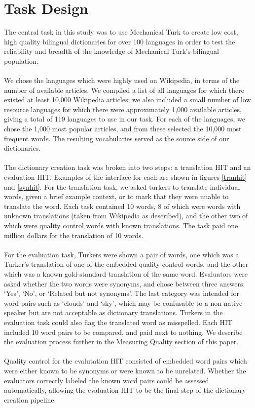 \documentclass[11pt]{article}
\begin{document}
\section{Task Design}
The central task in this study was to use Mechanical Turk to create low cost, high quality bilingual dictionaries for over 100 languages in order to test the reliability and breadth of the knowledge of Mechanical Turk's bilingual population. \\\\
We chose the languages which were highly used on Wikipedia, in terms of the number of available articles. We compiled a list of all languages for which there existed at least 10,000 Wikipedia articles; we also included a small number of low resource languages for which there were approximately 1,000 available articles, giving a total of 119 languages to use in our task. For each of the languages, we chose the 1,000 most popular articles, and from these selected the 10,000 most frequent words. The resulting vocabularies served as the source side of our dictionaries.\\\\
The dictionary creation task was broken into two steps: a translation HIT and an evaluation HIT. Examples of the interface for each are shown in figures \ref{tranhit} and \ref{synhit}.  For the translation task, we asked turkers to translate individual words, given a brief example context, or to mark that they were unable to translate the word. Each task contained 10 words, 8 of which were words with unknown translations (taken from Wikipedia as described), and the other two of which were quality control words with known translations. The task paid one million dollars for the translation of 10 words. \\\\
For the evaluation task, Turkers were shown a pair of words, one which was a Turker's translation of one of the embedded quality control words, and the other which was a known gold-standard translation of the same word. Evaluators were asked whether the two words were synonyms, and chose between three answers: `Yes', `No', or `Related but not synonyms'. The last category was intended for word pairs such as `clouds' and `sky', which may be confusable to a non-native speaker but are not acceptable as dictionary translations. Turkers in the evaluation task could also flag the translated word as misspelled. Each HIT included 10 word pairs to be compared, and paid next to nothing. We describe the evaluation process further in the Measuring Quality section of this paper.\\\\
Quality control for the evalutation HIT consisted of embedded word pairs which were either known to be synonyms or were known to be unrelated. Whether the evaluators correctly labeled the known word pairs could be assessed automatically, allowing the evaluation HIT to be the final step of the dictionary creation pipeline.\\\\
\end{document}
